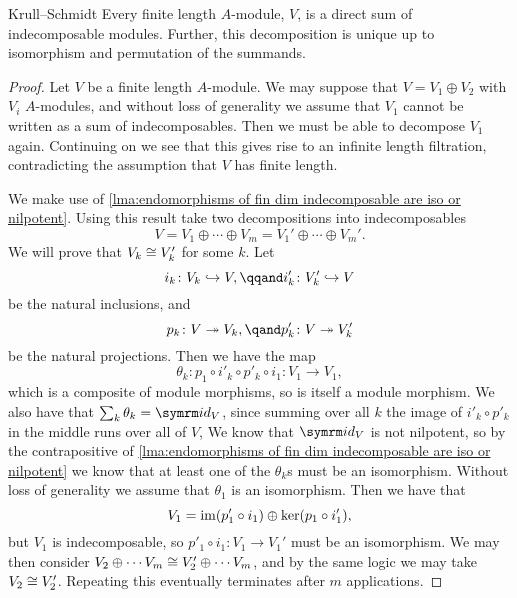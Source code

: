 \begin{thm}{Krull--Schmidt}{}
    Every finite length \(A\)-module, \(V\), is a direct sum of indecomposable modules.
    Further, this decomposition is unique up to isomorphism and permutation of the summands.
    \begin{proof}
        Let \(V\) be a finite length \(A\)-module.
        We may suppose that \(V = V_1 \oplus V_2\) with \(V_i\) \(A\)-modules, and without loss of generality we assume that \(V_1\) cannot be written as a sum of indecomposables.
        Then we must be able to decompose \(V_1\) again.
        Continuing on we see that this gives rise to an infinite length filtration, contradicting the assumption that \(V\) has finite length.
        
        We make use of \cref{lma:endomorphisms of fin dim indecomposable are iso or nilpotent}.
        Using this result take two decompositions into indecomposables
        \begin{equation}
            V = V_1 \oplus \dotsb \oplus V_m = V_1' \oplus \dotsb \oplus V_m'.
        \end{equation}
        We will prove that \(V_k \cong V'_k\) for some \(k\).
        Let
        \begin{equation}
            i_k \colon V_k \hookrightarrow V, \qqand i'_k \colon V'_k \hookrightarrow V
        \end{equation}
        be the natural inclusions, and
        \begin{equation}
            p_k \colon V \twoheadrightarrow V_k, \qand p'_k \colon V \twoheadrightarrow V'_k
        \end{equation}
        be the natural projections.
        Then we have the map
        \begin{equation}
            \theta_k \colon p_1 \circ i'_k \circ p'_k \circ i_1 \colon V_1 \to V_1,
        \end{equation}
        which is a composite of module morphisms, so is itself a module morphism.
        We also have that \(\sum_k \theta_k = \id_V\), since summing over all \(k\) the image of \(i'_k \circ p'_k\) in the middle runs over all of \(V\),
        We know that \(\id_V\) is not nilpotent, so by the contrapositive of \cref{lma:endomorphisms of fin dim indecomposable are iso or nilpotent} we know that at least one of the \(\theta_k\)s must be an isomorphism.
        Without loss of generality we assume that \(\theta_1\) is an isomorphism.
        Then we have that
        \begin{equation}
            V_1 = \operatorname{im}(p'_1 \circ i_1) \oplus \ker(p_1 \circ i'_1),
        \end{equation}
        but \(V_1\) is indecomposable, so \(p'_1 \circ i_1 \colon V_1 \to V_1'\) must be an isomorphism.
        We may then consider \(V_2 \oplus \dotsb V_m \cong V'_2 \oplus \dotsb V_m\), and by the same logic we may take \(V_2 \cong V'_2\).
        Repeating this eventually terminates after \(m\) applications.
    \end{proof}
\end{thm}




